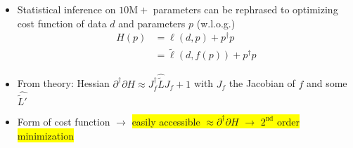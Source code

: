 \documentclass[aspectratio=169,xcolor=dvipsnames]{beamer}
\begin{document}
\begin{frame}
	\frametitle{\insertsection}
	\framesubtitle{\insertsubsection}

	\begin{itemize}
		\item Statistical inference on $10\mathrm{M}+$ parameters can be rephrased to optimizing cost function of data $d$ and parameters $p$ (w.l.o.g.)
		\begin{align*}
			H(p) &= \ell(d, p) + p^\dagger p
			\\ &= \tilde{\ell}(d, f(p)) + p^\dagger p
		\end{align*}
		\pause
		\item From theory: Hessian $\partial^\dagger \partial H \approx J_{f}^\dagger \widehat{\tilde{L}} J_{f} + 1$ with $J_{f}$ the Jacobian of $f$ and some $\widehat{\tilde{L}'}$
		\pause
		\item Form of cost function $\rightarrow$ \colorbox{yellow}{easily accessible $\approx \partial^\dagger \partial H$ $\rightarrow$ $2^\text{nd}$ order minimization}
	\end{itemize}

\end{frame}
\end{document}
